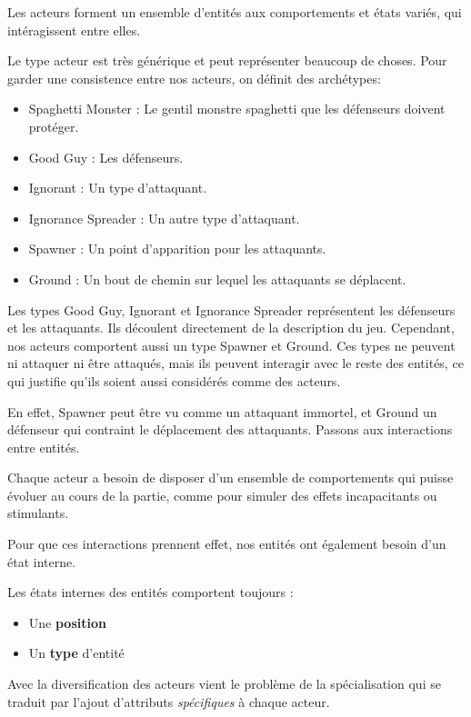 \documentclass{article}
\begin{document}
Les acteurs forment un ensemble d'entités aux comportements et états variés, 
qui intéragissent entre elles.

Le type acteur est très générique et peut représenter beaucoup de choses.
Pour garder une consistence entre nos acteurs, on définit des archétypes:
\vspace{8px}
\begin{itemize}
   \item Spaghetti Monster : Le gentil monstre spaghetti que les défenseurs doivent protéger.
   \item Good Guy : Les défenseurs.
   \item Ignorant : Un type d'attaquant.
   \item Ignorance Spreader : Un autre type d'attaquant.
   \item Spawner : Un point d'apparition pour les attaquants.
   \item Ground : Un bout de chemin sur lequel les attaquants se déplacent.
\end{itemize}
\vspace{8px}
Les types Good Guy, Ignorant et Ignorance Spreader représentent 
les défenseurs et les attaquants. Ils découlent directement de la description du jeu.
Cependant, nos acteurs comportent aussi un type Spawner et Ground.
Ces types ne peuvent ni attaquer ni être attaqués, mais ils peuvent interagir avec le reste des entités, ce qui justifie qu'ils
soient aussi considérés comme des acteurs.

En effet, Spawner peut être vu comme un attaquant immortel, et Ground 
un défenseur qui contraint le déplacement des attaquants.
\vspace{8px}
Passons aux interactions entre entités.

Chaque acteur a besoin de disposer d'un ensemble de comportements qui puisse évoluer 
au cours de la partie, comme pour simuler des effets incapacitants 
ou stimulants.

Pour que ces interactions prennent effet, nos entités ont 
également besoin d'un état interne.

Les états internes des entités comportent toujours :

\begin{itemize}
    \item Une \textbf{position}
    \item Un \textbf{type} d'entité
\end{itemize}

Avec la diversification des acteurs vient le problème de la spécialisation qui se traduit par l'ajout d'attributs \emph{spécifiques} à chaque acteur.
\end{document}
